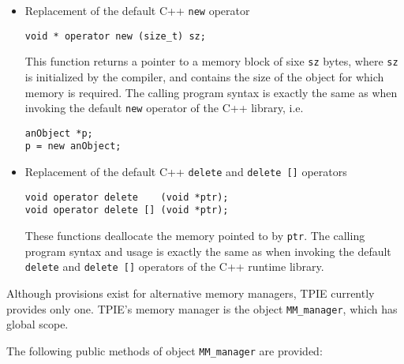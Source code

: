\begin{itemize}
\item Replacement of the default C++ \verb|new| operator
\begin{verbatim}
void * operator new (size_t) sz;
\end{verbatim}
This function returns a pointer to a memory block of sixe
\verb|sz| bytes, where \verb|sz| is initialized by the
compiler, and contains the size of the object
for which memory is required. The calling program syntax is
exactly the same as when invoking the default \verb|new|
operator of the C++ library, i.e. 

\begin{verbatim}
anObject *p;
p = new anObject; 
\end{verbatim}

\item Replacement of the default C++ \verb|delete| and
\verb|delete []| operators
\begin{verbatim}
void operator delete    (void *ptr);
void operator delete [] (void *ptr);
\end{verbatim}

These functions deallocate the memory pointed to by
\verb|ptr|. The calling program syntax and usage is exactly
the same as when invoking the default \verb|delete| and
\verb|delete []| operators of the C++ runtime library.

\end{itemize}

Although provisions exist for alternative memory managers,
TPIE currently provides only one. TPIE's memory manager is the object
\verb|MM_manager|, which has global scope. 

The following public methods of object \verb|MM_manager| are
provided:

